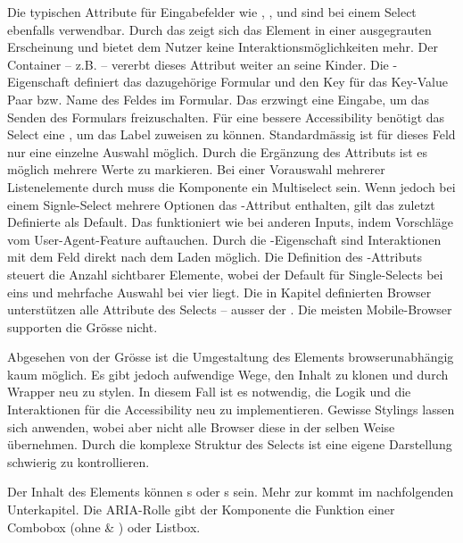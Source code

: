 Die typischen Attribute für Eingabefelder wie , ,  und  sind bei einem Select ebenfalls verwendbar.
Durch das  zeigt sich das Element in einer ausgegrauten Erscheinung und bietet dem Nutzer keine Interaktionsmöglichkeiten mehr.
Der Container – z.B.  – vererbt dieses Attribut weiter an seine Kinder. 
Die -Eigenschaft definiert das dazugehörige Formular und  den Key für das Key-Value Paar bzw. Name des Feldes im Formular. 
Das  erzwingt eine Eingabe, um das Senden des Formulars freizuschalten.
Für eine bessere Accessibility benötigt das Select eine , um das Label zuweisen zu können. 
Standardmässig ist für dieses Feld nur eine einzelne Auswahl möglich.
Durch die Ergänzung des Attributs  ist es möglich mehrere Werte zu markieren.
Bei einer Vorauswahl mehrerer Listenelemente durch  muss die Komponente ein Multiselect sein.
Wenn jedoch bei einem Signle-Select mehrere Optionen das -Attribut enthalten, gilt das zuletzt Definierte als Default.
Das  funktioniert wie bei anderen Inputs, indem Vorschläge vom User-Agent-Feature auftauchen.
Durch die -Eigenschaft sind Interaktionen mit dem Feld direkt nach dem Laden möglich.
Die Definition des -Attributs steuert die Anzahl sichtbarer Elemente, wobei der Default für Single-Selects bei eins und mehrfache Auswahl bei vier liegt.
Die in Kapitel \textbf{} definierten Browser unterstützen alle Attribute des Selects – ausser der .
Die meisten Mobile-Browser supporten die Grösse nicht.

Abgesehen von der Grösse ist die Umgestaltung des Elements browserunabhängig kaum möglich.
Es gibt jedoch aufwendige Wege, den Inhalt zu klonen und durch Wrapper neu zu stylen.
In diesem Fall ist es notwendig, die Logik und die Interaktionen für die Accessibility neu zu implementieren.
Gewisse Stylings lassen sich anwenden, wobei aber nicht alle Browser diese in der selben Weise übernehmen.
Durch die komplexe Struktur des Selects ist eine eigene Darstellung schwierig zu kontrollieren.

Der Inhalt des Elements können s oder s sein.
Mehr zur  kommt im nachfolgenden Unterkapitel.
Die ARIA-Rolle gibt der Komponente die Funktion einer Combobox (ohne  \& ) oder Listbox.

